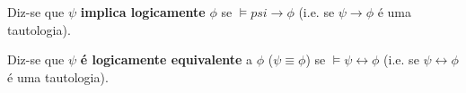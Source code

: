 \begin{definition}[label=(\alph*)]
    \item Diz-se que $\psi$ \textbf{implica logicamente} $\phi$ se $\models psi \to \phi$ (i.e. se $\psi \to \phi$ é uma tautologia).
    \item Diz-se que $\psi$ \textbf{é logicamente equivalente} a $\phi$ ($\psi \equiv \phi$) se $\models \psi \leftrightarrow \phi$ (i.e. se $\psi \leftrightarrow \phi$ é uma tautologia).
\end{definition}